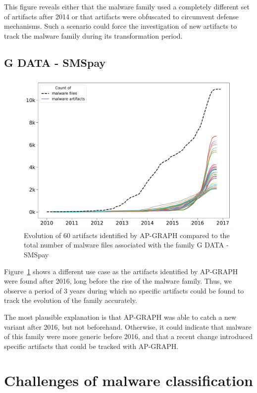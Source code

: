 This figure reveals either that the malware family used a completely different set of artifacts after 2014 or that artifacts were obfuscated to circumvent defense mechanisms.
Such a scenario could force the investigation of new artifacts to track the malware family during its transformation period.
\subsection{G DATA - SMSpay}

\begin{figure}[!ht]
        \centering
	\includegraphics[width=0.85\linewidth]{figures/apgraph/artifacts/gdata_smspay.pdf}
        \caption[Evolution of artifacts identified by AP-GRAPH for G Data - SMSpay]{Evolution of 60 artifacts identified by AP-GRAPH compared to the total number of malware files associated with the family G DATA - SMSpay}
	\label{figure:apgraph:artifacts:smspay}
\end{figure}

Figure~\ref{figure:apgraph:artifacts:smspay} shows a different use case as the artifacts identified by AP-GRAPH were found after 2016, long before the rise of the malware family.
Thus, we observe a period of 3 years during which no specific artifacts could be found to track the evolution of the family accurately.

The most plausible explanation is that AP-GRAPH was able to catch a new variant after 2016, but not beforehand.
Otherwise, it could indicate that malware of this family were more generic before 2016, and that a recent change introduced specific artifacts that could be tracked with AP-GRAPH.
\section{Challenges of malware classification}
